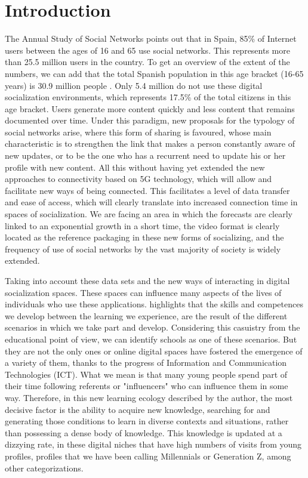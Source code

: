 \documentclass{textolivre}
\begin{document}
\section{Introduction}\label{sec-intro}
The Annual Study of Social Networks \cite{spain2019} points out that in Spain, 85\% of Internet users between the ages of 16 and 65 use social networks. This represents more than 25.5 million users in the country. To get an overview of the extent of the numbers, we can add that the total Spanish population in this age bracket (16-65 years) is 30.9 million people \cite{instituto2018}. Only 5.4 million do not use these digital socialization environments, which represents 17.5\% of the total citizens in this age bracket. Users generate more content quickly and less content that remains documented over time. Under this paradigm, new proposals for the typology of social networks arise, where this form of sharing is favoured, whose main characteristic is to strengthen the link that makes a person constantly aware of new updates, or to be the one who has a recurrent need to update his or her profile with new content. All this without having yet extended the new approaches to connectivity based on 5G technology, which will allow and facilitate new ways of being connected. This facilitates a level of data transfer and ease of access, which will clearly translate into increased connection time in spaces of socialization. We are facing an area in which the forecasts are clearly linked to an exponential growth in a short time, the video format is clearly located as the reference packaging in these new forms of socializing, and the frequency of use of social networks by the vast majority of society is widely extended.

Taking into account these data sets and the new ways of interacting in digital socialization spaces. These spaces can influence many aspects of the lives of individuals who use these applications. \textcite{coll2013} highlights that the skills and competences we develop between the learning we experience, are the result of the different scenarios in which we take part and develop. Considering this casuistry from the educational point of view, we can identify schools as one of these scenarios. But they are not the only ones or online digital spaces have fostered the emergence of a variety of them, thanks to the progress of Information and Communication Technologies (ICT). What we mean is that many young people spend part of their time following referents or "influencers" who can influence them in some way. Therefore, in this new learning ecology described by the author, the most decisive factor is the ability to acquire new knowledge, searching for and generating those conditions to learn in diverse contexts and situations, rather than possessing a dense body of knowledge. This knowledge is updated at a dizzying rate, in these digital niches that have high numbers of visits from young profiles, profiles that we have been calling Millennials or Generation Z, among other categorizations.
\end{document}
